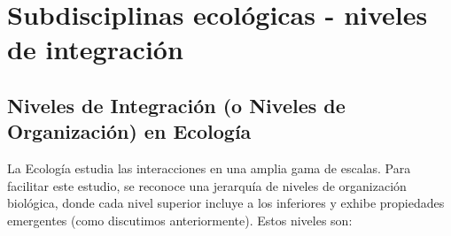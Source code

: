 \documentclass[
]{book}
\begin{document}
\section*{Subdisciplinas ecológicas - niveles de integración}\label{subdnintegr}

\subsection*{\texorpdfstring{\textbf{Niveles de Integración (o Niveles de Organización) en Ecología}}{Niveles de Integración (o Niveles de Organización) en Ecología}}\label{nintegr}

La Ecología estudia las interacciones en una amplia gama de escalas. Para facilitar este estudio, se reconoce una jerarquía de niveles de organización biológica, donde cada nivel superior incluye a los inferiores y exhibe propiedades emergentes (como discutimos anteriormente). Estos niveles son:
\end{document}
